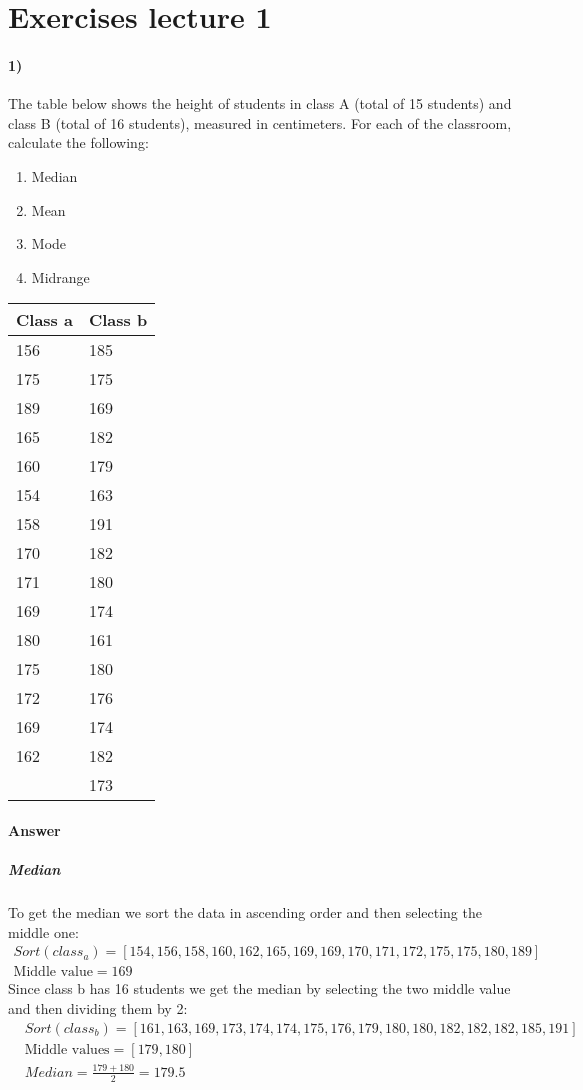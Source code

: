 \documentclass{article}
\newcommand{\paraheading}[1]{\paragraph{#1} \mbox{}} %
\newcommand{\subparaheading}[1]{\subparagraph{#1} \mbox{}}
\begin{document}
	\section{Exercises lecture 1}
	\paraheading{1)}
	The table below shows the height of students in class A (total of 15 students) and class B (total of 16 students), measured in centimeters. For each of the classroom, calculate the following:
	\begin{enumerate}
		\item Median
		\item Mean
		\item Mode
		\item Midrange
	\end{enumerate}
	\begin{table}[h]
		\centering
		\begin{tabular}{|l|l|} \hline
			Class a & Class b \\ \hline
			156 & 185 \\ \hline
			175 & 175 \\ \hline
			189 & 169 \\ \hline
			165 & 182 \\ \hline
			160 & 179 \\ \hline
			154 & 163 \\ \hline
			158 & 191 \\ \hline
			170 & 182 \\ \hline
			171 & 180 \\ \hline
			169 & 174 \\ \hline
			180 & 161 \\ \hline
			175 & 180 \\ \hline
			172 & 176 \\ \hline
			169 & 174 \\ \hline
			162 & 182 \\ \hline
			& 173 \\ \hline
		\end{tabular}
	\end{table}
	\paraheading{Answer}
	
	\subparaheading{Median}
	To get the median we sort the data in ascending order and then selecting the middle one:
	\begin{align*}
		Sort(class_a) = [154, 156, 158, 160, 162, 165, 169, 169, 170, 171, 172, 175, 175, 180, 189]\\
		\text{Middle value} = 169
	\end{align*}
	Since class b has 16 students we get the median by selecting the two middle value and then dividing them by 2:
	\begin{align*}
		&Sort(class_b) = [161, 163, 169, 173, 174, 174, 175, 176, 179, 180, 180, 182, 182, 182, 185, 191] \\
		&\text{Middle values} = [179, 180] \\
		&Median = \frac{179+180}{2}=179.5
	\end{align*}
	
\end{document}
